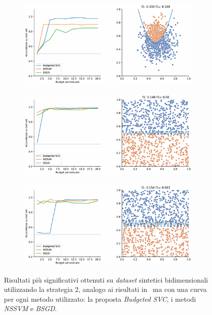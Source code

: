 \begin{figure}[b!]
\centering
    \begin{subfigure}{.8\textwidth}
        \centering
        \includegraphics[width=\textwidth]{img/comp_new/4.pdf}
    \end{subfigure}%
    \hfill
    \begin{subfigure}{.8\textwidth}
        \centering
        \includegraphics[width=\textwidth]{img/comp_new/7.pdf}
    \end{subfigure}
    \hfill
    \begin{subfigure}{.8\textwidth}
        \centering
        \includegraphics[width=\textwidth]{img/comp_new/8.pdf}
    \end{subfigure}%
    \caption[Risultati su \emph{dataset} sintetici utilizzando strategia 2 in confronto ad altri metodi.]{Risultati più significativi ottenuti su \emph{dataset} sintetici bidimensionali utilizzando la strategia 2, analogo ai risultati in~ ma con una curva per ogni metodo utilizzato: la proposta \emph{Budgeted SVC}, i metodi \emph{NSSVM} e \emph{BSGD}.}
\end{figure}
